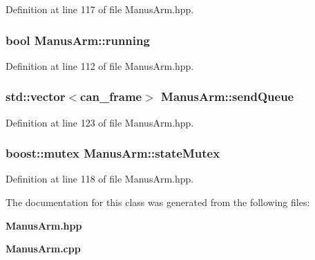 \-Definition at line 117 of file \-Manus\-Arm.\-hpp.

\subsubsection[{running}]{\setlength{\rightskip}{0pt plus 5cm}bool {\bf \-Manus\-Arm\-::running}\hspace{0.3cm}{\ttfamily  [private]}}\label{classManusArm_ae75dc5af7c9c1e60bed18699f0e5bf4e}


\-Definition at line 112 of file \-Manus\-Arm.\-hpp.

\subsubsection[{send\-Queue}]{\setlength{\rightskip}{0pt plus 5cm}std\-::vector$<$can\-\_\-frame$>$ {\bf \-Manus\-Arm\-::send\-Queue}\hspace{0.3cm}{\ttfamily  [private]}}\label{classManusArm_ae2c56bb1f4f070175e891f53e89b5db2}


\-Definition at line 123 of file \-Manus\-Arm.\-hpp.

\subsubsection[{state\-Mutex}]{\setlength{\rightskip}{0pt plus 5cm}boost\-::mutex {\bf \-Manus\-Arm\-::state\-Mutex}\hspace{0.3cm}{\ttfamily  [private]}}\label{classManusArm_a5391659e5a713fc592825b8758a27edf}


\-Definition at line 118 of file \-Manus\-Arm.\-hpp.



\-The documentation for this class was generated from the following files\-:\begin{DoxyCompactItemize}
\item 
{\bf \-Manus\-Arm.\-hpp}\item 
{\bf \-Manus\-Arm.\-cpp}\end{DoxyCompactItemize}
